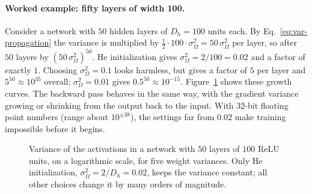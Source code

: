 \paragraph{Worked example: fifty layers of width 100.}
Consider a network with $50$ hidden layers of $D_h = 100$ units each. By
Eq.~\eqref{eq:var-propagation} the variance is multiplied by
$\tfrac12 \cdot 100 \cdot \sigma_\Omega^2 = 50\,\sigma_\Omega^2$ per layer, so
after $50$ layers by $(50\,\sigma_\Omega^2)^{50}$.
He initialization gives $\sigma_\Omega^2 = 2/100 = 0.02$ and a factor of exactly
$1$. Choosing $\sigma_\Omega^2 = 0.1$ looks harmless, but gives a factor of $5$
per layer and $5^{50} \approx 10^{35}$ overall; $\sigma_\Omega^2 = 0.01$ gives
$0.5^{50} \approx 10^{-15}$. Figure~\ref{fig:init-variance} shows these growth
curves. The backward pass behaves in the same way, with the gradient variance
growing or shrinking from the output back to the input. With $32$-bit floating
point numbers (range about $10^{\pm38}$), the settings far from $0.02$ make
training impossible before it begins.

\begin{figure}[ht]
  \centering
  \caption{Variance of the activations in a network with $50$ layers of $100$
  ReLU units, on a logarithmic scale, for five weight variances. Only He
  initialization, $\sigma_\Omega^2 = 2/D_h = 0.02$, keeps the variance constant;
  all other choices change it by many orders of magnitude.}
  \label{fig:init-variance}
\end{figure}

